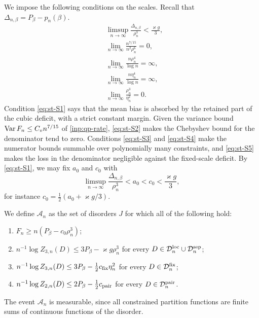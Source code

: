We impose the following conditions on the scales. Recall that $\Delta_{n,\beta}=P_\beta-p_n(\beta)$.
\begin{align}
 &\limsup_{n\to\infty}\frac{\Delta_{n,\beta}}{\rho_n^3}<\frac{\varkappa g}3,\tag{S1}\label{eq:st-S1}\\
 &\lim_{n\to\infty}\frac{n^{7/15}}{n^2\rho_n^6}=0,\tag{S2}\label{eq:st-S2}\\
 &\lim_{n\to\infty}\frac{n\rho_n^4}{\log n}=\infty,\tag{S3}\label{eq:st-S3}\\
 &\lim_{n\to\infty}\frac{n\eta_n^4}{\log n}=\infty,\tag{S4}\label{eq:st-S4}\\
 &\lim_{n\to\infty}\frac{\rho_n^3}{\eta_n^2}=0.\tag{S5}\label{eq:st-S5}
\end{align}
Condition \eqref{eq:st-S1} says that the mean bias is absorbed by the retained part of the cubic deficit, with a strict constant margin. Given the variance bound $\operatorname{Var} F_n\le C_vn^{7/15}$ of \cref{inp:qp-rate}, \eqref{eq:st-S2} makes the Chebyshev bound for the denominator tend to zero. Conditions \eqref{eq:st-S3} and \eqref{eq:st-S4} make the numerator bounds summable over polynomially many constraints, and \eqref{eq:st-S5} makes the loss in the denominator negligible against the fixed-scale deficit. By \eqref{eq:st-S1}, we may fix $a_0$ and $c_0$ with
\begin{equation}\label{b:eq:denominator-margin}
 \limsup_{n\to\infty}\frac{\Delta_{n,\beta}}{\rho_n^3}<a_0<c_0<\frac{\varkappa g}3,
\end{equation}
for instance $c_0=\frac12(a_0+\varkappa g/3)$.

We define $\mathcal A_n$ as the set of disorders $J$ for which all of the following hold:
\begin{enumerate}
\item[(A1)] $F_n\ge n(P_\beta-c_0\rho_n^3)$;
\item[(A2)] $n^{-1}\log Z_{3,n}(D)\le3P_\beta-\varkappa g\rho_n^3$ for every $D\in\mathcal D^{\rm loc}_n\cup\mathcal D^{\rm sep}_n$;
\item[(A3)] $n^{-1}\log Z_{3,n}(D)\le3P_\beta-\frac12c_{\rm fix}\eta_n^2$ for every $D\in\mathcal D^{\rm fix}_n$;
\item[(A4)] $n^{-1}\log Z_{2,n}(D)\le2P_\beta-\frac12c_{\rm pair}$ for every $D\in\mathcal D^{\rm pair}_n$.
\end{enumerate}
The event $\mathcal A_n$ is measurable, since all constrained partition functions are finite sums of continuous functions of the disorder.

